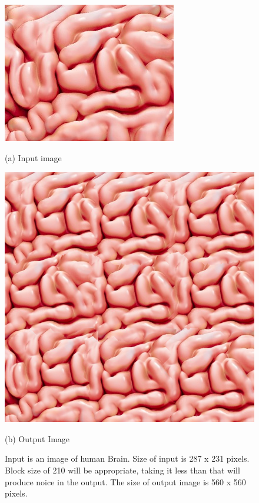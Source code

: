 \documentclass[12pt,a4paper]{report}
\begin{document}
\begin{figure}[H]
  \centering
  \centering
  \includegraphics[scale=0.42]{pics/brain.jpeg}
  \caption*{(a) Input image}
  \endminipage\hspace*{0.2cm}
  \centering
  \includegraphics[scale=0.4]{pics/brain_210_3.png}
    \caption*{(b) Output Image}
  \endminipage
  \caption{Input is an image of human Brain. Size of input is 287 x 231 pixels. Block size of 210 will be appropriate, taking it less than that will produce noice in the output. The size of output image is 560 x 560 pixels.}
  
\end{figure}

\newpage 
\end{document}
